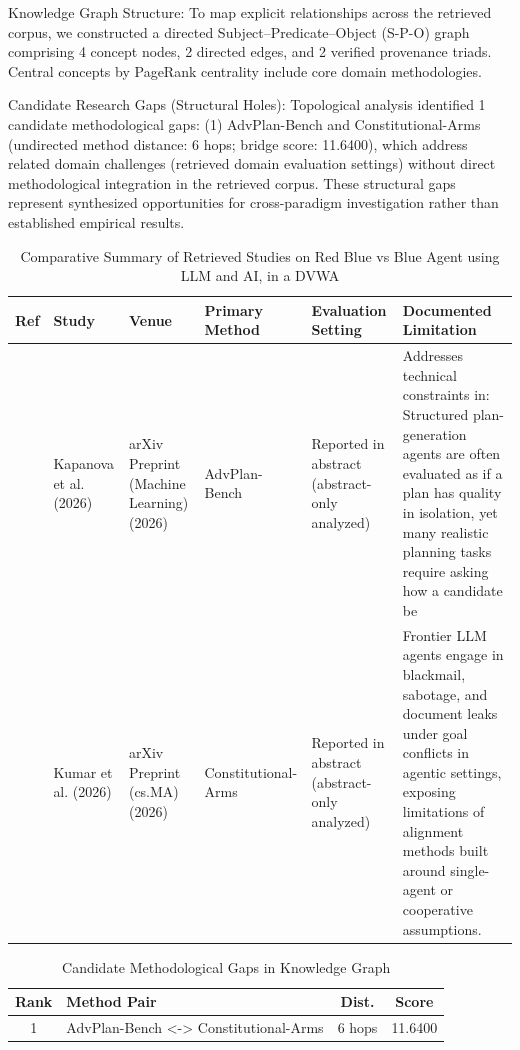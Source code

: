 \documentclass[10pt,twocolumn,letterpaper]{article}
\begin{document}
Knowledge Graph Structure: To map explicit relationships across the retrieved corpus, we constructed a directed Subject–Predicate–Object (S-P-O) graph comprising 4 concept nodes, 2 directed edges, and 2 verified provenance triads. Central concepts by PageRank centrality include core domain methodologies.

Candidate Research Gaps (Structural Holes): Topological analysis identified 1 candidate methodological gaps: (1) AdvPlan-Bench and Constitutional-Arms (undirected method distance: 6 hops; bridge score: 11.6400), which address related domain challenges (retrieved domain evaluation settings) without direct methodological integration in the retrieved corpus. These structural gaps represent synthesized opportunities for cross-paradigm investigation rather than established empirical results.

\begin{table}[t]
\centering
\caption{Comparative Summary of Retrieved Studies on Red Blue vs Blue Agent using LLM and AI, in a DVWA}
\label{tab:comparative_studies}
\scriptsize
\begin{tabularx}{\textwidth}{l l l X X X}
\toprule
\textbf{Ref} & \textbf{Study} & \textbf{Venue} & \textbf{Primary Method} & \textbf{Evaluation Setting} & \textbf{Documented Limitation} \\
\midrule
\cite{ref1} & Kapanova et al. (2026) & arXiv Preprint (Machine Learning) (2026) & AdvPlan-Bench & Reported in abstract (abstract-only analyzed) & Addresses technical constraints in: Structured plan-generation agents are often evaluated as if a plan has quality in isolation, yet many realistic planning tasks require asking how a candidate be \\
\cite{ref2} & Kumar et al. (2026) & arXiv Preprint (cs.MA) (2026) & Constitutional-Arms & Reported in abstract (abstract-only analyzed) & Frontier LLM agents engage in blackmail, sabotage, and document leaks under goal conflicts in agentic settings, exposing limitations of alignment methods built around single-agent or cooperative assumptions. \\
\bottomrule
\end{tabularx}
\end{table}

\begin{table}[h]
\centering
\caption{Candidate Methodological Gaps in Knowledge Graph}
\label{tab:structural_holes}
\scriptsize
\begin{tabularx}{\columnwidth}{c X c c}
\toprule
\textbf{Rank} & \textbf{Method Pair} & \textbf{Dist.} & \textbf{Score} \\
\midrule
1 & AdvPlan-Bench <-> Constitutional-Arms & 6 hops & 11.6400 \\
\bottomrule
\end{tabularx}
\end{table}
\end{document}
